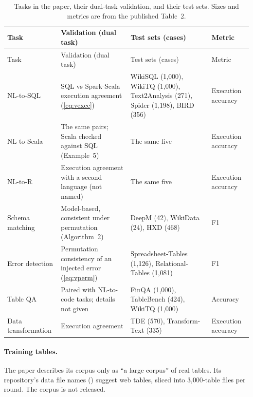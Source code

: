 {\small
{}
\begin{longtable}{@{}p{2.6cm}p{4.2cm}p{4.6cm}p{3.2cm}@{}}
\caption{Tasks in the paper, their dual-task validation, and their test sets. Sizes and metrics are from the published
Table~2.}\label{tab:paper-tasks}\\
\toprule\rowcolor{headshade}
Task & Validation (dual task) & Test sets (cases) & Metric\\\midrule\endfirsthead
\toprule\rowcolor{headshade}
Task & Validation (dual task) & Test sets (cases) & Metric\\\midrule\endhead
\bottomrule\endfoot
NL-to-SQL & SQL vs Spark-Scala execution agreement (\cref{eq:vexec}) & WikiSQL (1,000), WikiTQ (1,000),
Text2Analysis (271), Spider (1,198), BIRD (356) & Execution accuracy\\
NL-to-Scala & The same pairs; Scala checked against SQL (Example~5) & The same five & Execution accuracy\\
NL-to-R & Execution agreement with a second language (not named) & The same five & Execution accuracy\\
Schema matching & Model-based, consistent under permutation (Algorithm~2) & DeepM (42), WikiData (24), HXD (468) &
F1\\
Error detection & Permutation consistency of an injected error (\cref{eq:vperm}) & Spreadsheet-Tables (1,126),
Relational-Tables (1,081) & F1\\
Table QA & Paired with NL-to-code tasks; details not given & FinQA (1,000), TableBench (424), WikiTQ (1,000) & Accuracy\\
Data transformation & Execution agreement & TDE (570), Transform-Text (335) & Execution accuracy\\
\end{longtable}
}

\paragraph{Training tables.} The paper describes its corpus only as ``a large corpus'' of real tables. Its repository's
data file names () suggest web tables, sliced into 3,000-table files per
round. The corpus is not released.

